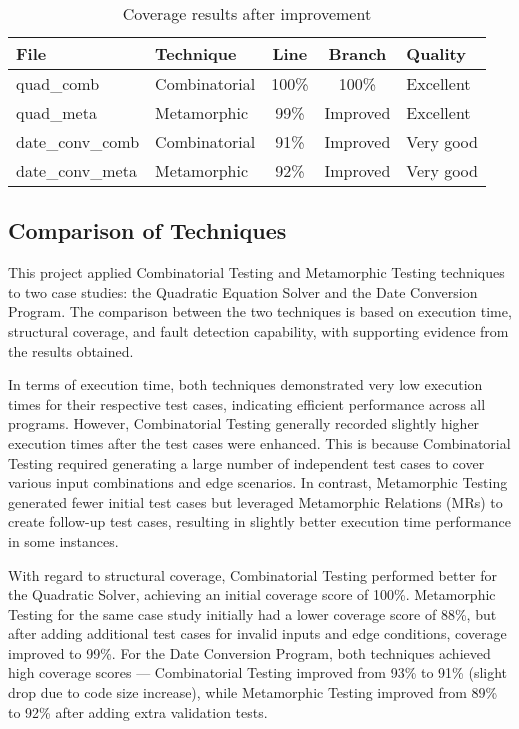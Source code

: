 \documentclass[conference]{IEEEtran}
\begin{document}
\begin{table}[htbp]
\caption{Coverage results after improvement}
\centering
\begin{tabular}{|l|l|c|c|l|}
\hline
File & Technique & Line & Branch & Quality \\
\hline
quad\_comb & Combinatorial & 100\% & 100\% & Excellent \\
quad\_meta & Metamorphic   & 99\%  & Improved & Excellent \\
date\_conv\_comb & Combinatorial & 91\%  & Improved & Very good \\
date\_conv\_meta & Metamorphic   & 92\%  & Improved & Very good \\
\hline
\end{tabular}
\end{table}
    
    
\subsection{Comparison of Techniques}
This project applied Combinatorial Testing and Metamorphic Testing techniques to two case studies: the Quadratic Equation Solver and the Date Conversion Program. The comparison between the two techniques is based on execution time, structural coverage, and fault detection capability, with supporting evidence from the results obtained.

In terms of execution time, both techniques demonstrated very low execution times for their respective test cases, indicating efficient performance across all programs. However, Combinatorial Testing generally recorded slightly higher execution times after the test cases were enhanced. This is because Combinatorial Testing required generating a large number of independent test cases to cover various input combinations and edge scenarios. In contrast, Metamorphic Testing generated fewer initial test cases but leveraged Metamorphic Relations (MRs) to create follow-up test cases, resulting in slightly better execution time performance in some instances.

With regard to structural coverage, Combinatorial Testing performed better for the Quadratic Solver, achieving an initial coverage score of 100\%. Metamorphic Testing for the same case study initially had a lower coverage score of 88\%, but after adding additional test cases for invalid inputs and edge conditions, coverage improved to 99\%. For the Date Conversion Program, both techniques achieved high coverage scores --- Combinatorial Testing improved from 93\% to 91\% (slight drop due to code size increase), while Metamorphic Testing improved from 89\% to 92\% after adding extra validation tests.
\end{document}
